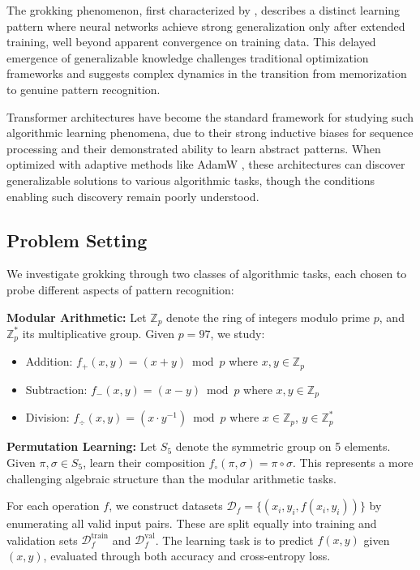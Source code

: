 \documentclass{article} %
\begin{document}
The grokking phenomenon, first characterized by \citet{power2022grokking}, describes a distinct learning pattern where neural networks achieve strong generalization only after extended training, well beyond apparent convergence on training data. This delayed emergence of generalizable knowledge challenges traditional optimization frameworks \citep{goodfellow2016deep} and suggests complex dynamics in the transition from memorization to genuine pattern recognition.

Transformer architectures \citep{vaswani2017attention} have become the standard framework for studying such algorithmic learning phenomena, due to their strong inductive biases for sequence processing and their demonstrated ability to learn abstract patterns. When optimized with adaptive methods like AdamW \citep{loshchilov2017adamw}, these architectures can discover generalizable solutions to various algorithmic tasks, though the conditions enabling such discovery remain poorly understood.

\subsection{Problem Setting}
We investigate grokking through two classes of algorithmic tasks, each chosen to probe different aspects of pattern recognition:

\textbf{Modular Arithmetic:} Let $\mathbb{Z}_p$ denote the ring of integers modulo prime $p$, and $\mathbb{Z}_p^*$ its multiplicative group. Given $p=97$, we study:
\begin{itemize}
    \item Addition: $f_+(x,y) = (x + y) \bmod p$ where $x,y \in \mathbb{Z}_p$
    \item Subtraction: $f_-(x,y) = (x - y) \bmod p$ where $x,y \in \mathbb{Z}_p$
    \item Division: $f_{\div}(x,y) = (x \cdot y^{-1}) \bmod p$ where $x \in \mathbb{Z}_p$, $y \in \mathbb{Z}_p^*$
\end{itemize}

\textbf{Permutation Learning:} Let $S_5$ denote the symmetric group on 5 elements. Given $\pi,\sigma \in S_5$, learn their composition $f_{\circ}(\pi,\sigma) = \pi \circ \sigma$. This represents a more challenging algebraic structure than the modular arithmetic tasks.

For each operation $f$, we construct datasets $\mathcal{D}_f = \{(x_i,y_i,f(x_i,y_i))\}$ by enumerating all valid input pairs. These are split equally into training and validation sets $\mathcal{D}_f^{\text{train}}$ and $\mathcal{D}_f^{\text{val}}$. The learning task is to predict $f(x,y)$ given $(x,y)$, evaluated through both accuracy and cross-entropy loss.
\end{document}
